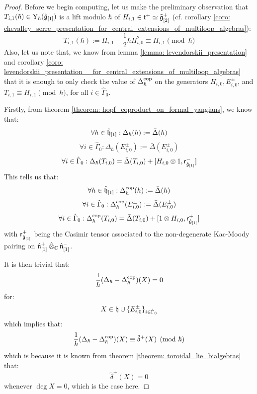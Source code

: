             \begin{proof}
                Before we begin computing, let us make the preliminary observation that $T_{i, 1}(\hbar) \in \mathrm{Y}_{\hbar}(\hat{\mathfrak{g}}_{[1]})$ is a lift modulo $\hbar$ of $H_{i, 1} \in \mathfrak{t}^+ \simeq \tilde{\mathfrak{g}}_{[2]}^+$ (cf. corollary \ref{coro: chevalley_serre_presentation_for_central_extensions_of_multiloop_algebras}):
                    $$T_{i, 1}(\hbar) := H_{i, 1} - \frac12 \hbar H_{i, 0}^2 \equiv H_{i, 1} \pmod{\hbar}$$
                Also, let us note that, we know from lemma \ref{lemma: levendorskii_presentation} and corollary \ref{coro: levendorskii_presentation__for_central_extensions_of_multiloop_algebras} that it is enough to only check the value of $\Delta_{\hbar}^{\mathrm{cop}}$ on the generators $H_{i, 0}, E_{i, 0}^{\pm}$, and $T_{i, 1} \equiv H_{i, 1} \pmod{\hbar}$, for all $i \in \hat{\Gamma}_0$.
            
                Firstly, from theorem \ref{theorem: hopf_coproduct_on_formal_yangians}, we know that:
                    $$\forall h \in \hat{\mathfrak{h}}_{[1]}: \Delta_{\hbar}(h) := \bar{\Delta}(h)$$
                    $$\forall i \in \hat{\Gamma}_0: \Delta_{\hbar}(E_{i, 0}^{\pm}) := \bar{\Delta}(E_{i, 0}^{\pm})$$
                    $$\forall i \in \hat{\Gamma}_0: \Delta_{\hbar}(T_{i, 0}) = \bar{\Delta}(T_{i, 0}) + [H_{i, 0} \tensor 1, \sfr_{ \hat{\g}_{[1]} }^-]$$
                This tells us that:
                    $$\forall h \in \hat{\mathfrak{h}}_{[1]}: \Delta_{\hbar}^{\mathrm{cop}}(h) := \bar{\Delta}(h)$$
                    $$\forall i \in \hat{\Gamma}_0: \Delta_{\hbar}^{\mathrm{cop}}(E_{i, 0}^{\pm}) := \bar{\Delta}(E_{i, 0}^{\pm})$$
                    $$\forall i \in \hat{\Gamma}_0: \Delta_{\hbar}^{\cop}(T_{i, 0}) = \bar{\Delta}(T_{i, 0}) + [1 \tensor H_{i, 0}, \sfr_{ \hat{\g}_{[1]} }^+]$$
                with $\mathsf{r}_{\hat{\mathfrak{g}}_{[1]}}^+$ being the Casimir tensor associated to the non-degenerate Kac-Moody pairing on $\hat{\n}_{[1]}^+ \hattensor_{\bbC} \hat{\n}_{[1]}^-$.

                It is then trivial that:
                    $$\frac{1}{\hbar}( \Delta_{\hbar} - \Delta_{\hbar}^{\mathrm{cop}} )(X) = 0$$
                for:
                    $$X \in \mathfrak{h} \cup \{E_{i, 0}^{\pm}\}_{i \in \hat{\Gamma}_0}$$
                which implies that:
                    $$\frac{1}{\hbar}( \Delta_{\hbar} - \Delta_{\hbar}^{\mathrm{cop}} )(X) \equiv \tilde{\delta}^+(X) \pmod{\hbar}$$
                which is because it is known from theorem \ref{theorem: toroidal_lie_bialgebras} that:
                    $$\tilde{\delta}^+(X) = 0$$
                whenever $\deg X = 0$, which is the case here.
                

\end{proof}
